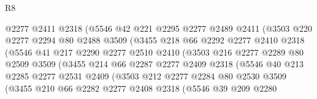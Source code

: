\begin{lexlean}{R8}
\begin{coremodule}
                      @2277
                      @2411
                      @2318
                      (@5546
                        @42
                        @221
                        @2295
                        @2277
                        @2489
                        @2411
                        (@3503
                          @220
                          @2277
                          @2294
                          @80
                          @2488
                          @3509
                          (@3455
                            @218
                            @66
                            @2292
                            @2277
                            @2410
                            @2318
                            (@5546
                              @41
                              @217
                              @2290
                              @2277
                              @2510
                              @2410
                              (@3503
                                @216
                                @2277
                                @2289
                                @80
                                @2509
                                @3509
                                (@3455
                                  @214
                                  @66
                                  @2287
                                  @2277
                                  @2409
                                  @2318
                                  (@5546
                                    @40
                                    @213
                                    @2285
                                    @2277
                                    @2531
                                    @2409
                                    (@3503
                                      @212
                                      @2277
                                      @2284
                                      @80
                                      @2530
                                      @3509
                                      (@3455
                                        @210
                                        @66
                                        @2282
                                        @2277
                                        @2408
                                        @2318
                                        (@5546
                                          @39
                                          @209
                                          @2280

\end{coremodule}
\end{lexlean}
